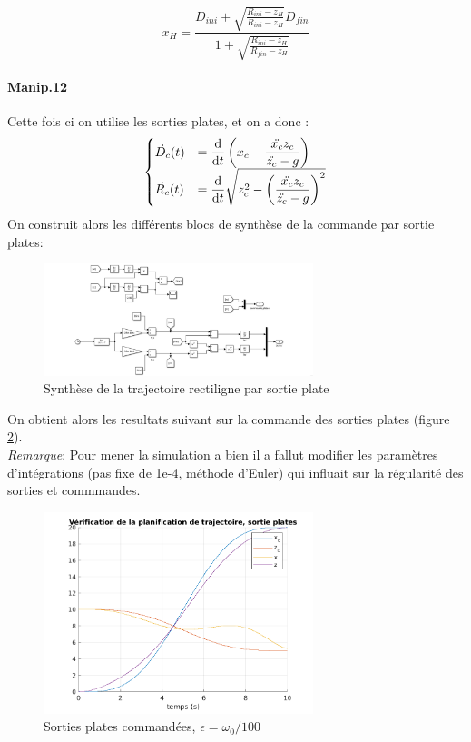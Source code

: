 \documentclass[10pt,a4paper,notitlepage]{article}
\begin{document}
\begin{equation}
  x_{H}=\frac{D_{i n i}+\sqrt{\frac{R_{i n i}-z_{H}}{R_{i n i}-z_{H}}} D_{f i n}}%
{1+\sqrt{\frac{R_{i n i}-z_{H}}{R_{f i n}-z_{H}}}}
\end{equation}
\paragraph{Manip.12}
Cette fois ci on utilise les sorties plates, et on a donc :
\[
  \begin{cases}
    \dot{D_c}(t) &= \displaystyle\deriv[]{t}\left( x_c- \frac{\ddot{x_c}z_c }{\ddot{z_c}-g}\right)\\
    \dot{R_c}(t) &= \displaystyle\deriv[]{t}\sqrt{z_c^2-\left(\frac{\ddot{x_c}z_c }{\ddot{z_c}-g}\right)^2}
  \end{cases}
\]
On construit alors les différents blocs de synthèse de la commande par
sortie plates:
\begin{figure}[H]
  \centering
  \includegraphics[width=0.7\textwidth]{rect_plat.png}
  \caption{Synthèse de la trajectoire rectiligne par sortie plate}
  \label{fig:label}
\end{figure}On obtient alors les resultats suivant sur la commande des sorties
plates (figure \ref{fig:sortiesplates}).\\

\textit{Remarque}: Pour mener la simulation a bien il a fallut
modifier les paramètres d'intégrations (pas fixe de 1e-4, méthode
d'Euler) qui influait sur la régularité des sorties et commmandes.
\begin{figure}[H]
  \centering
  \includegraphics[width=0.7\textwidth]{manip12.png}
  \caption{Sorties plates commandées, $\epsilon= \omega_0/100$}
  \label{fig:sortiesplates}
\end{figure}
\end{document}
